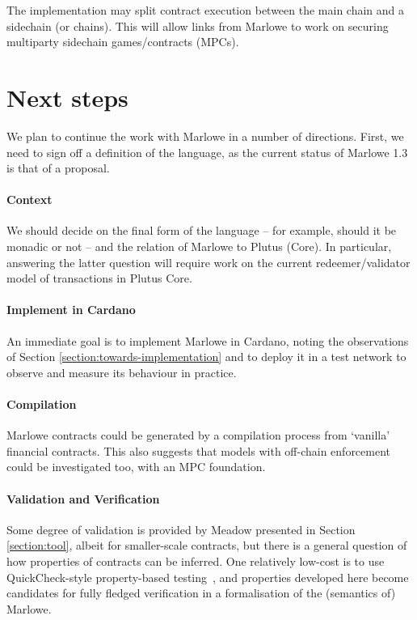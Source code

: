 \documentclass[runningheads]{llncs}
\begin{document}
The implementation may split contract execution between the main chain and a sidechain (or chains). This will allow 
links from Marlowe to work on securing multiparty sidechain games/contracts (MPCs).


\section{Next steps}
\label{section:next-steps}

We plan to continue the work with Marlowe in a number of directions. First, we need to sign off a definition of the 
language, as the current status of Marlowe 1.3 is that of a proposal.

\paragraph{Context}

We should decide on the final form of the language -- for example, should it be monadic or not -- and the relation of 
Marlowe to Plutus (Core). In particular, answering the latter question will require work on the current 
redeemer/validator model of transactions in Plutus Core.

\paragraph{Implement in Cardano}

An immediate goal is to implement Marlowe in Cardano, noting the observations of Section 
\ref{section:towards-implementation} and to deploy it in a test network to observe and measure its behaviour in 
practice.

\paragraph{Compilation}

Marlowe contracts could be generated by a compilation process from `vanilla' financial contracts. This also suggests 
that models with off-chain enforcement could be investigated too, with an MPC foundation.

\paragraph{Validation and Verification}

Some degree of validation is provided by Meadow presented in Section \ref{section:tool}, albeit for smaller-scale 
contracts, but there is a general question of how properties of contracts can be inferred. One relatively low-cost is to 
use QuickCheck-style property-based testing~\cite{quickCheck}, and properties developed here become candidates for 
fully fledged verification in a formalisation of the (semantics of) Marlowe.
\end{document}
